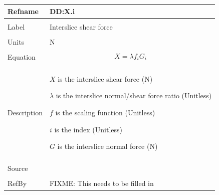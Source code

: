 \documentclass[12pt]{article}
\begin{document}
\noindent \begin{minipage}{\textwidth}
\begin{tabular}{p{} p{}}
\toprule \textbf{Refname} & \textbf{DD:X.i}
\label{DD:X.i}
\\ \midrule \\
Label & Interslice shear force
\\ \midrule \\
Units & N
\\ \midrule \\
Equation & \begin{dmath}
           X=λ f_{i} G_{i}
           \end{dmath}
\\ \midrule \\
Description & \begin{symbDescription}
              \item{$X$ is the interslice shear force (N)}
              \item{$λ$ is the interslice normal/shear force ratio (Unitless)}
              \item{$f$ is the scaling function (Unitless)}
              \item{$i$ is the index (Unitless)}
              \item{$G$ is the interslice normal force (N)}
              \end{symbDescription}
\\ \midrule \\
Source &
\\ \midrule \\
RefBy & FIXME: This needs to be filled in
\\ \bottomrule \end{tabular}
\end{minipage}\\
~\newline
\end{document}

